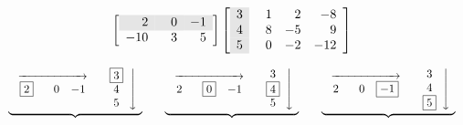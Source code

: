\[ \left[\begin{array}{rrr} \rowcolor[gray]{0.9} 2 & \hphantom{-}0 & -1 \\ -10 & 3 & 5 \\ \end{array} \right] \left[\begin{array}{>{\columncolor[gray]{0.9}}rrrr}  3 & \hphantom{-}1 & 2 & -8 \\ 4 & 8 & -5 & 9  \\ 5 & 0 & -2 & -12 \\  \end{array} \right] \]


\[ \begin{array}{ccccc}

 \underbrace{\begin{array}{rl} \stackrel{\xrightarrow{\hspace{.75in}}}{\begin{array}{ccc} \fbox{2} &  \hphantom{-}0 & -1 \end{array}} & \left. \begin{array}{c} \fbox{3}  \\ 4   \\ 5  \\ \end{array} \right\downarrow \\ \end{array}}

&

&

\underbrace{\begin{array}{rl} \stackrel{\xrightarrow{\hspace{.75in}}}{\begin{array}{ccc} 2 & \hphantom{-}\fbox{0} & -1 \end{array}} &  \left.  \begin{array}{c} 3 \\ \fbox{4}    \\ 5  \\ \end{array} \right\downarrow \\\end{array}}

& 


&


\underbrace{\begin{array}{rl} \stackrel{\xrightarrow{\hspace{.75in}}}{\begin{array}{ccc} 2 & \hphantom{-}0 & \fbox{$-1$} \end{array}} &  \left. \begin{array}{c} 3 \\ 4 \\ \fbox{5}   \\ \end{array} \right\downarrow \\ \end{array}}  \\


\end{array}\]
